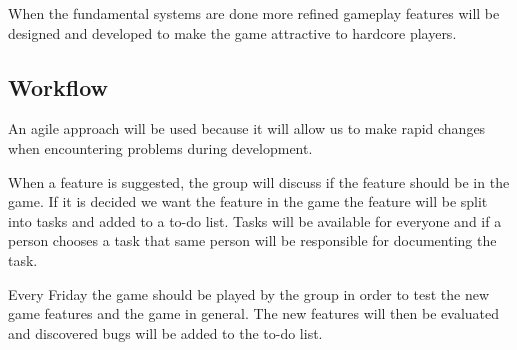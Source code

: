 When the fundamental systems are done more refined gameplay features will be designed and developed to make the game attractive to hardcore players.

\subsection{Workflow}
An agile approach will be used because it will allow us to make rapid changes when encountering problems during development.

When a feature is suggested, the group will discuss if the feature should be in the game.
If it is decided we want the feature in the game the feature will be split into tasks and added to a to-do list.
Tasks will be available for everyone and if a person chooses a task that same person will be responsible for documenting the task.

Every Friday the game should be played by the group in order to test the new game features and the game in general.
The new features will then be evaluated and discovered bugs will be added to the to-do list.
